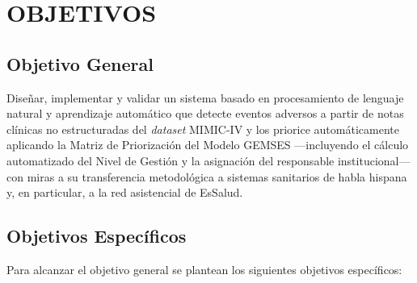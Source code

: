 
\chapter{OBJETIVOS}
\label{cap:objetivos}

\section{Objetivo General}
\label{sec:obj_general}

Diseñar, implementar y validar un sistema basado en procesamiento de lenguaje natural y aprendizaje automático que detecte eventos adversos a partir de notas clínicas no estructuradas del \textit{dataset} MIMIC-IV y los priorice automáticamente aplicando la Matriz de Priorización del Modelo GEMSES ---incluyendo el cálculo automatizado del Nivel de Gestión y la asignación del responsable institucional--- con miras a su transferencia metodológica a sistemas sanitarios de habla hispana y, en particular, a la red asistencial de EsSalud.

\section{Objetivos Específicos}
\label{sec:obj_especificos}

Para alcanzar el objetivo general se plantean los siguientes objetivos específicos:

